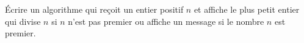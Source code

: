 
Écrire un algorithme qui reçoit un entier positif $n$ et affiche le plus petit entier qui divise $n$ si $n$ n'est pas premier ou affiche un message si le nombre $n$ est premier.




